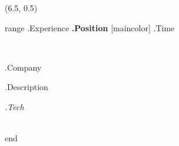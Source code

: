 \begin{textblock}{14.5}(6.5, 0.5)

{{range .Experience}}
    {\Large\ffmfamily\bfseries {{.Position}}} \xrfill[0.0ex]{0.5pt}[maincolor]  {{.Time}}

    \begin{minipage}{5mm}
    ~
    \end{minipage}
    \begin{minipage}{142mm}
        {{.Company}}

        \smallskip

        {{.Description}}

        \smallskip

        {\textit {{.Tech}}}
    \end{minipage} \\[2ex]
{{end}}


\end{textblock}

